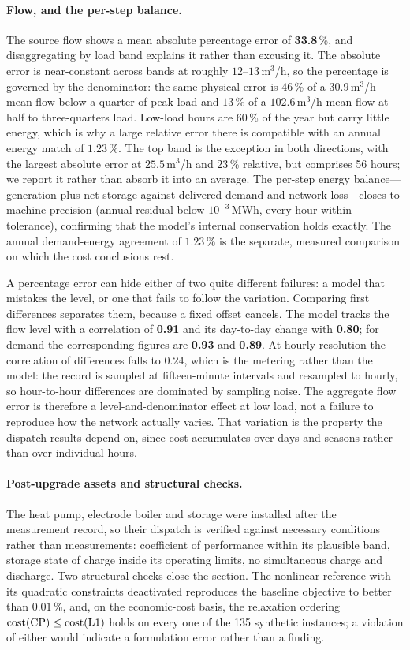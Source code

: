 \paragraph{Flow, and the per-step balance.}
The source flow shows a mean absolute percentage error of \textbf{33.8}\,\%, and
disaggregating by load band explains it rather than excusing it. The absolute error is
near-constant across bands at roughly $12$--$13$\,m$^3$/h, so the percentage is governed by
the denominator: the same physical error is $46$\,\% of a $30.9$\,m$^3$/h mean flow below a
quarter of peak load and $13$\,\% of a $102.6$\,m$^3$/h mean flow at half to three-quarters
load. Low-load hours are $60$\,\% of the year but carry little energy, which is why a large
relative error there is compatible with an annual energy match of $1.23$\,\%. The top band
is the exception in both directions, with the largest absolute error at $25.5$\,m$^3$/h and
$23$\,\% relative, but comprises 56 hours; we report it rather than absorb it into an
average. The per-step energy balance---generation plus net storage against delivered demand and
network loss---closes to machine precision (annual residual below $10^{-3}$\,MWh, every hour
within tolerance), confirming that the model's internal conservation holds exactly. The
annual demand-energy agreement of $1.23$\,\% is the separate, measured comparison on which
the cost conclusions rest.

A percentage error can hide either of two quite different failures: a model that mistakes
the level, or one that fails to follow the variation. Comparing first differences separates
them, because a fixed offset cancels. The model tracks the flow level with a correlation of
\textbf{0.91} and its day-to-day change with \textbf{0.80}; for demand the corresponding
figures are \textbf{0.93} and \textbf{0.89}. At hourly resolution the correlation of
differences falls to $0.24$, which is the metering rather than the model: the record is
sampled at fifteen-minute intervals and resampled to hourly, so hour-to-hour differences are
dominated by sampling noise. The aggregate flow error is therefore a level-and-denominator
effect at low load, not a failure to reproduce how the network actually varies. That
variation is the property the dispatch results depend on, since cost accumulates over days
and seasons rather than over individual hours.

\paragraph{Post-upgrade assets and structural checks.}
The heat pump, electrode boiler and storage were installed after the measurement record, so
their dispatch is verified against necessary conditions rather than measurements:
coefficient of performance within its plausible band, storage state of charge inside its
operating limits, no simultaneous charge and discharge. Two structural checks close the
section. The nonlinear reference with its quadratic constraints deactivated reproduces the
baseline objective to better than $0.01$\,\%, and, on the economic-cost basis, the relaxation ordering
$\mathrm{cost}(\mathrm{CP}) \le \mathrm{cost}(\mathrm{L1})$ holds on every one of the 135 synthetic
instances; a violation of either would indicate a formulation error rather than a finding.
